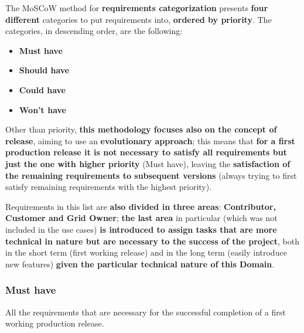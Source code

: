 \vspace{10mm}
The MoSCoW method for \textbf{requirements categorization} presents \textbf{four different} categories to put requirements into, \textbf{ordered by priority}. The categories, in descending order, are the following:
\begin{itemize}
    \item \textbf{Must have}
    \item \textbf{Should have}
    \item \textbf{Could have}
    \item \textbf{Won't have}
\end{itemize}
Other than priority, \textbf{this methodology focuses also on the concept of release}, aiming to use an \textbf{evolutionary approach}; this means that \textbf{for a first production release it is not necessary to satisfy all requirements but just the one with higher priority} (Must have), leaving the \textbf{satisfaction of the remaining requirements to subsequent versions} (always trying to first satisfy remaining requirements with the highest priority).

Requirements in this list are \textbf{also divided in three areas}: \textbf{Contributor, Customer and Grid Owner}; \textbf{the last area} in particular (which was not included in the use cases) \textbf{is introduced to assign tasks that are more technical in nature but are necessary to the success of the project}, both in the short term (first working release) and in the long term (easily introduce new features) \textbf{given the particular technical nature of this Domain}.

\subsubsection{Must have}
All the requirements that are necessary for the successful completion of a first working production release.

